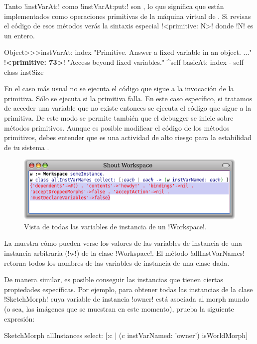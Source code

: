 \documentclass[a4paper,10pt,twoside]{book}
\begin{document}
Tanto \ct!instVarAt:! como \ct!instVarAt:put:! son , lo que significa que están implementados como
operaciones primitivas de la máquina virtual de \pharo.  Si revisas el
código de esos métodos verás la sintaxis especial 
\ct!<primitive: N>! donde \ct!N! es un entero.

\begin{code}{}
Object>>>instVarAt: index
        "Primitive. Answer a fixed variable in an object. ..."
        !\textbf{<primitive: 73>}!
        "Access beyond fixed variables."
        ^self basicAt: index - self class instSize
\end{code}

En el caso más usual no se ejecuta el código que sigue a la invocación
de la primitiva.  Sólo se ejecuta si la primitiva falla.  En este caso
específico, si tratamos de acceder una variable que no existe entonces
se ejecuta el código que sigue a la primitiva.  De este modo se
permite también que el debugger se inicie sobre métodos primitivos.
Aunque es posible modificar el código de los métodos primitivos, debes
entender que es una actividad de alto riesgo para la estabilidad de tu
sistema \pharo.

\begin{figure}[ht]\centering
        \includegraphics[width=\linewidth]{allInstanceVariables}
        \caption{Vista de todas las variables de instancia de un \ct!Workspace!.}
\end{figure}

La  muestra cómo pueden verse los valores
de las variables de instancia de una instancia arbitraria (\ct!w!) de
la clase \ct!Workspace!.  El método \ct!allInstVarNames! retorna todos
los nombres de las variables de instancia de una clase dada.

De manera similar, es posible conseguir las instancias que tienen
ciertas propiedades específicas.  Por ejemplo, para obtener todas las
instancias de la clase \ct!SketchMorph! cuya variable de instancia
\ct!owner! está asociada al morph mundo (o sea, las imágenes que se
muestran en este momento), prueba la siguiente expresión:
\begin{code}{}
SketchMorph allInstances select: [:c | (c instVarNamed: 'owner') isWorldMorph]
\end{code}
\end{document}
